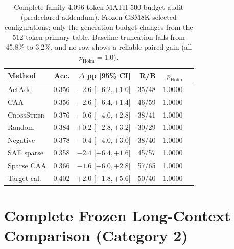 \begin{table}[H]
\centering
\scriptsize
\setlength{\tabcolsep}{3pt}
\caption{Complete-family 4,096-token MATH-500 budget audit (predeclared
addendum).  Frozen GSM8K-selected configurations; only the generation budget
changes from the 512-token primary table.  Baseline truncation falls from
45.8\% to 3.2\%, and no row shows a reliable paired gain (all
$p_{\mathrm{Holm}}{=}1.0$).}
\label{tab:ood-4096}
\begin{tabular}{@{}lrrrrr@{}}
\toprule
Method & Acc. & $\Delta$ pp [95\% CI] & R/B & $p_{\mathrm{Holm}}$ \\
\midrule
ActAdd & 0.356 & $-2.6$ [$-6.2,+1.0$] & 35/48 & 1.0000 \\
CAA & 0.356 & $-2.6$ [$-6.4,+1.4$] & 46/59 & 1.0000 \\
\textsc{CrossSteer} & 0.376 & $-0.6$ [$-4.0,+2.8$] & 38/41 & 1.0000 \\
Random & 0.384 & $+0.2$ [$-2.8,+3.2$] & 30/29 & 1.0000 \\
Negative & 0.378 & $-0.4$ [$-4.0,+3.0$] & 38/40 & 1.0000 \\
SAE sparse & 0.358 & $-2.4$ [$-6.4,+1.6$] & 45/57 & 1.0000 \\
Sparse CAA & 0.366 & $-1.6$ [$-6.0,+2.8$] & 57/65 & 1.0000 \\
Target-cal. & 0.402 & $+2.0$ [$-1.8,+5.6$] & 50/40 & 1.0000 \\
\bottomrule
\end{tabular}
\end{table}
\FloatBarrier

\section{Complete Frozen Long-Context Comparison (Category 2)}
\label{app:long-context-results}


